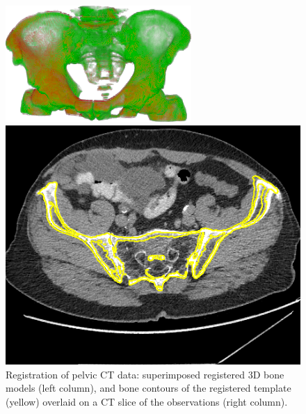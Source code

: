 \documentclass[10pt, a4paper]{article}
\begin{document}
{\begin{enumerate}
\begin{figure}[]
\begin{minipage}[b]{.42\linewidth}
\centerline{\includegraphics[width=\linewidth]{figures/research/sa_09_10_cut_3d_reg_overlay_gc}}
\vspace{1mm}
\end{minipage}
\hfill
\begin{minipage}[b]{0.42\linewidth}
  \centering
  \centerline{\includegraphics[width=\linewidth]{figures/research/SA_09_10_cut_Reg_Overlay_0056_cut}}
\vspace{1mm}
\end{minipage}
\caption{Registration of pelvic CT data: superimposed registered 3D bone
models (left column), and
bone contours of the registered template (yellow) overlaid on a CT slice of the observations (right column).
}
\label{fig:realct}
\end{figure}


\end{enumerate}}
\end{document}
